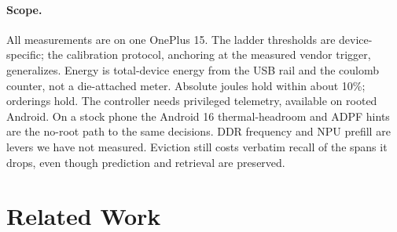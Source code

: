 \documentclass[sigconf, anonymous=false, screen=true]{acmart}
\begin{document}
\paragraph{Scope.} All measurements are on one OnePlus 15. The ladder thresholds are device-specific; the calibration protocol, anchoring at the measured vendor trigger, generalizes. Energy is total-device energy from the USB rail and the coulomb counter, not a die-attached meter. Absolute joules hold within about 10\%; orderings hold. The controller needs privileged telemetry, available on rooted Android. On a stock phone the Android 16 thermal-headroom and ADPF hints are the no-root path to the same decisions. DDR frequency and NPU prefill are levers we have not measured. Eviction still costs verbatim recall of the spans it drops, even though prediction and retrieval are preserved.

\section{Related Work}
\label{sec:related}
\end{document}
